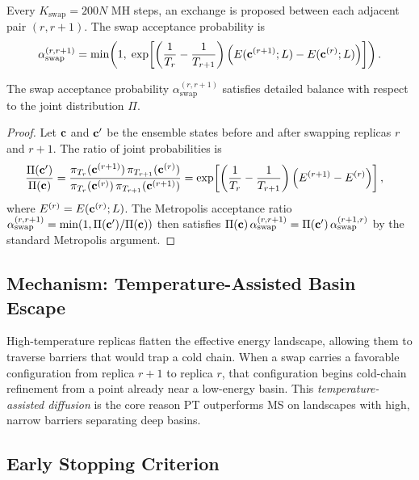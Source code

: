Every $K_{\mathrm{swap}} = 200N$ MH steps, an exchange is proposed
between each adjacent pair $(r, r+1)$.
The swap acceptance probability is
\[
  \alpha_{\mathrm{swap}}^{(r,r+1)}
  = \min\!\left(1,\;
    \exp\!\left[
      \left(\frac{1}{T_r} - \frac{1}{T_{r+1}}\right)
      \Bigl(E(\mathbf{c}^{(r+1)};L) - E(\mathbf{c}^{(r)};L)\Bigr)
    \right]
  \right).
\]

\begin{proposition}
The swap acceptance probability $\alpha_{\mathrm{swap}}^{(r,r+1)}$
satisfies detailed balance with respect to the joint distribution $\Pi$.
\end{proposition}

\begin{proof}
Let $\bm{\mathbf{c}}$ and $\bm{\mathbf{c}}'$ be the ensemble states before and after
swapping replicas $r$ and $r+1$. The ratio of joint probabilities is
\begin{align*}
  \frac{\Pi(\bm{\mathbf{c}}')}{\Pi(\bm{\mathbf{c}})}
  &= \frac{\pi_{T_r}(\mathbf{c}^{(r+1)})\,\pi_{T_{r+1}}(\mathbf{c}^{(r)})}
         {\pi_{T_r}(\mathbf{c}^{(r)})\,\pi_{T_{r+1}}(\mathbf{c}^{(r+1)})}
   = \exp\!\left[
     \left(\frac{1}{T_r} - \frac{1}{T_{r+1}}\right)
     \left(E^{(r+1)} - E^{(r)}\right)
   \right],
\end{align*}
where $E^{(r)} = E(\mathbf{c}^{(r)};L)$.
The Metropolis acceptance ratio $\alpha_{\mathrm{swap}}^{(r,r+1)} =
\min(1, \Pi(\bm{\mathbf{c}}')/\Pi(\bm{\mathbf{c}}))$ then satisfies
$\Pi(\bm{\mathbf{c}})\,\alpha_{\mathrm{swap}}^{(r,r+1)}
= \Pi(\bm{\mathbf{c}}')\,\alpha_{\mathrm{swap}}^{(r+1,r)}$
by the standard Metropolis argument.
\end{proof}

\subsection{Mechanism: Temperature-Assisted Basin Escape}

High-temperature replicas flatten the effective energy landscape,
allowing them to traverse barriers that would trap a cold chain.
When a swap carries a favorable configuration from replica $r+1$ to
replica $r$, that configuration begins cold-chain refinement from a
point already near a low-energy basin.
This \emph{temperature-assisted diffusion} is the core reason PT
outperforms MS on landscapes with high, narrow barriers separating
deep basins.

\subsection{Early Stopping Criterion}

